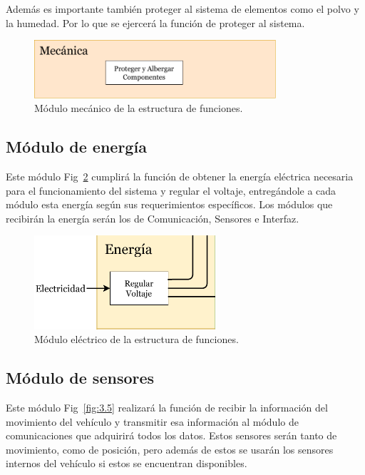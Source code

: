 Además es importante también proteger al sistema de elementos como el polvo y la humedad. Por lo que se ejercerá la función de proteger al sistema.

\begin{figure}[htbp!]
\centering
\includegraphics[width=0.8\textwidth]{mec.pdf}
\caption{Módulo mecánico de la estructura de funciones.}
\label{fig:3.3}
\end{figure}

\subsection{Módulo de energía}
Este módulo Fig~\ref{fig:3.4} cumplirá la función de obtener la energía eléctrica necesaria para el funcionamiento del sistema y regular el voltaje, entregándole a cada módulo esta energía según sus requerimientos específicos. Los módulos que recibirán la energía serán los de Comunicación, Sensores e Interfaz.

\begin{figure}[htbp!]
\centering
\includegraphics[width=0.6\textwidth]{elec.pdf}
\caption{Módulo eléctrico de la estructura de funciones.}
\label{fig:3.4}
\end{figure}


\subsection{Módulo de sensores}
Este módulo Fig~\ref{fig:3.5} realizará la función de recibir la información del movimiento del vehículo y transmitir esa información al módulo de comunicaciones que adquirirá todos los datos. Estos sensores serán tanto de movimiento, como de posición, pero además de estos se usarán los sensores internos del vehículo si estos se encuentran disponibles.

